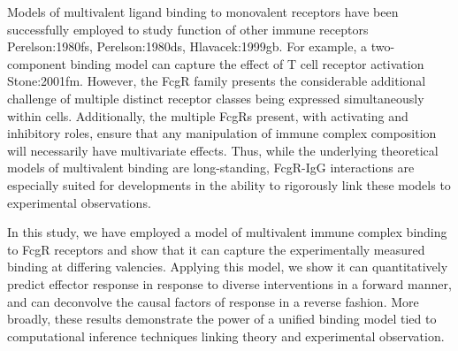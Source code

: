 Models of multivalent ligand binding to monovalent receptors have been successfully employed to study function of other immune receptors \ac{Perelson:1980fs, Perelson:1980ds, Hlavacek:1999gb}. For example, a two-component binding model can capture the effect of T cell receptor activation \ac{Stone:2001fm}. However, the FcgR family presents the considerable additional challenge of multiple distinct receptor classes being expressed simultaneously within cells. Additionally, the multiple FcgRs present, with activating and inhibitory roles, ensure that any manipulation of immune complex composition will necessarily have multivariate effects. Thus, while the underlying theoretical models of multivalent binding are long-standing, FcgR-IgG interactions are especially suited for developments in the ability to rigorously link these models to experimental observations.

In this study, we have employed a model of multivalent immune complex binding to FcgR receptors and show that it can capture the experimentally measured binding at differing valencies. Applying this model, we show it can quantitatively predict effector response in response to diverse interventions in a forward manner, and can deconvolve the causal factors of response in a reverse fashion. More broadly, these results demonstrate the power of a unified binding model tied to computational inference techniques linking theory and experimental observation.
















































